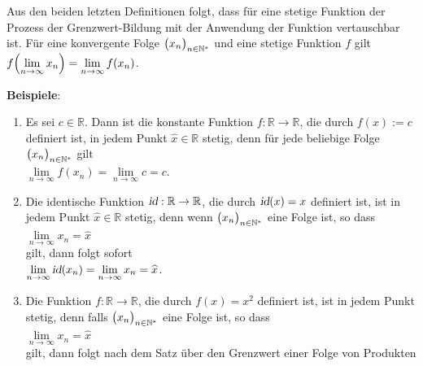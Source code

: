 \noindent
Aus den beiden letzten Definitionen folgt, dass
f\"ur eine stetige Funktion der Prozess der Grenzwert-Bildung mit der Anwendung der Funktion
vertauschbar ist.  F\"ur eine konvergente Folge $\bigl(x_n\bigr)_{n\in\mathbb{N}^*}$ und eine stetige Funktion $f$ gilt 
      \\[0.2cm]
      \hspace*{1.3cm}      
      $f\Bigl(\lim\limits_{n\rightarrow\infty} x_n\Bigr) = \lim\limits_{n\rightarrow\infty} f(x_n)$.
\vspace*{0.3cm}

\noindent
\textbf{Beispiele}:
\begin{enumerate}
\item Es sei $c \in \mathbb{R}$.  Dann ist die konstante Funktion
      $f: \mathbb{R} \rightarrow \mathbb{R}$, die durch $f(x) := c$ definiert ist, in
      jedem Punkt $\widehat{x}\in\mathbb{R}$ stetig, denn f\"ur jede beliebige Folge $\bigl(x_n\bigr)_{n\in\mathbb{N}^*}$ gilt 
      \\[0.2cm]
      \hspace*{1.3cm}      
      $\lim\limits_{n\rightarrow\infty} f(x_n) = \lim\limits_{n\rightarrow\infty} c = c$.
\item Die identische Funktion $\textsl{id}:\mathbb{R} \rightarrow \mathbb{R}$, die durch 
      $\textsl{id}(x) = x$ definiert ist, ist in jedem Punkt $\widehat{x}\in\mathbb{R}$ stetig,
      denn wenn $\bigl(x_n\bigr)_{n\in\mathbb{N}^*}$ eine Folge ist, so dass
      \\[0.2cm]
      \hspace*{1.3cm}      
      $\lim\limits_{n\rightarrow\infty} x_n = \widehat{x}$
      \\[0.2cm]
      gilt, dann folgt sofort 
      \\[0.2cm]
      \hspace*{1.3cm}      
      $\lim\limits_{n\rightarrow\infty} \textsl{id}(x_n) = \lim\limits_{n\rightarrow\infty} x_n = \widehat{x}$.
\item Die Funktion $f: \mathbb{R} \rightarrow \mathbb{R}$, die durch
      $f(x) = x^2$ definiert ist, ist in jedem Punkt stetig, denn falls
      $\bigl(x_n\bigr)_{n\in\mathbb{N}^*}$ eine Folge ist, so dass 
      \\[0.2cm]
      \hspace*{1.3cm}      
      $\lim\limits_{n\rightarrow\infty} x_n = \widehat{x}$ 
      \\[0.2cm]
      gilt, dann folgt nach dem Satz \"uber den Grenzwert einer Folge von Produkten
      \\[0.2cm]
      \hspace*{1.3cm}      

\end{enumerate}
